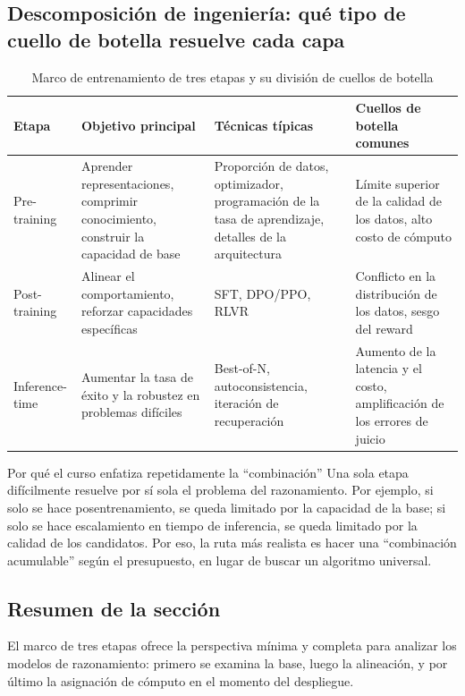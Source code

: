 \subsection{Descomposición de ingeniería: qué tipo de cuello de botella resuelve cada capa}
\begin{table}[H]
\centering
\renewcommand{\arraystretch}{1.2}
\begin{tabular}{p{2.6cm}p{3.2cm}p{4.0cm}p{3.2cm}}
\toprule
\textbf{Etapa} & \textbf{Objetivo principal} & \textbf{Técnicas típicas} & \textbf{Cuellos de botella comunes} \\
\midrule
Pre-training & Aprender representaciones, comprimir conocimiento, construir la capacidad de base & Proporción de datos, optimizador, programación de la tasa de aprendizaje, detalles de la arquitectura & Límite superior de la calidad de los datos, alto costo de cómputo \\
Post-training & Alinear el comportamiento, reforzar capacidades específicas & SFT, DPO/PPO, RLVR & Conflicto en la distribución de los datos, sesgo del reward \\
Inference-time & Aumentar la tasa de éxito y la robustez en problemas difíciles & Best-of-N, autoconsistencia, iteración de recuperación & Aumento de la latencia y el costo, amplificación de los errores de juicio \\
\bottomrule
\end{tabular}
\caption{Marco de entrenamiento de tres etapas y su división de cuellos de botella}
\end{table}

\begin{knowledgebox}{Por qué el curso enfatiza repetidamente la ``combinación''}
Una sola etapa difícilmente resuelve por sí sola el problema del razonamiento. Por ejemplo, si solo se hace posentrenamiento, se queda limitado por la capacidad de la base; si solo se hace escalamiento en tiempo de inferencia, se queda limitado por la calidad de los candidatos. Por eso, la ruta más realista es hacer una ``combinación acumulable'' según el presupuesto, en lugar de buscar un algoritmo universal.
\end{knowledgebox}

\subsection{Resumen de la sección}
El marco de tres etapas ofrece la perspectiva mínima y completa para analizar los modelos de razonamiento: primero se examina la base, luego la alineación, y por último la asignación de cómputo en el momento del despliegue.


